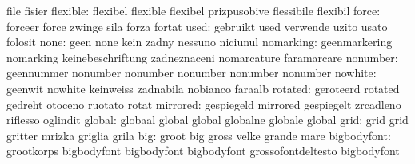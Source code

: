                            file                      fisier
                 flexible: flexibel                  flexible
                           flexibel                  prizpusobive
                           flessibile                flexibil
                    force: forceer                   force
                           zwinge                    sila
                           forza                     fortat
                     used: gebruikt                  used
                           verwende                  uzito
                           usato                     folosit
                     none: geen                      none
                           kein                      zadny
                           nessuno                   niciunul
                nomarking: geenmarkering             nomarking
                           keinebeschriftung         zadneznaceni
                           nomarcature               faramarcare
                 nonumber: geennummer                nonumber
                           nonumber                  nonumber
                           nonumber                  nonumber %
                  nowhite: geenwit                   nowhite
                           keinweiss                 zadnabila
                           nobianco                  faraalb
                  rotated: geroteerd                 rotated
                           gedreht                   otoceno
                           ruotato                   rotat
                 mirrored: gespiegeld                mirrored
                           gespiegelt                zrcadleno
                           riflesso                  oglindit
                   global: globaal                   global
                           global                    globalne
                           globale                   global
                     grid: grid                      grid
                           gritter                   mrizka
                           griglia                   grila
                      big: groot                     big
                           gross                     velke
                           grande                    mare
              bigbodyfont: grootkorps                bigbodyfont
                           bigbodyfont               bigbodyfont
                           grossofontdeltesto        bigbodyfont %
